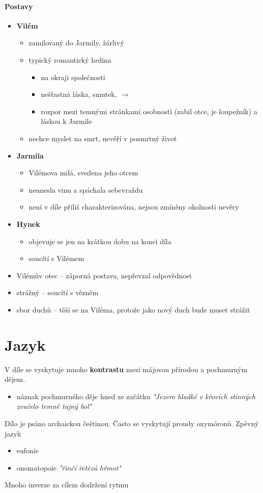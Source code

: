 \documentclass[10pt,a4paper]{article}
\newcommand{\ra}{$\rightarrow$ }
\begin{document}
\paragraph{Postavy}
\begin{itemize}
\item \textbf{Vilém}
	\begin{itemize}
	\item zamilovaný do Jarmily, žárlivý
	\item typický romantický hrdina
		\begin{itemize}
		\item na okraji společnosti
		\item nešťastná láska, smutek, \ra
		\item rozpor mezi temnými stránkami osobnosti (zabil otce, je loupežník) a láskou k Jarmile
		\end{itemize}
	\item nechce myslet na smrt, nevěří v posmrtný život
	\end{itemize}
\item \textbf{Jarmila}
	\begin{itemize}
	\item Vilémova milá, svedena jeho otcem
	\item neunesla vinu a spáchala sebevraždu
	\item není v díle příliš charakterizována, nejsou zmíněny okolnosti nevěry
	\end{itemize}
\item \textbf{Hynek}
	\begin{itemize}
	\item objevuje se jen na krátkou dobu na konci díla
	\item soucítí s Vilémem
	\end{itemize}
\item Vilémův otec -- záporná postava, nepřevzal odpovědnost
\item strážný -- soucítí s vězněm
\item sbor duchů -- těší se na Viléma, protože jako nový duch bude muset strážit
\end{itemize}
\section*{Jazyk}
V díle se vyskytuje mnoho \textbf{kontrastu} mezi májovou přírodou a pochmurným dějem.
\begin{itemize}
\item náznak pochmurného děje hned ze začátku \textit{"Jezero hladké v křovích stinných zvučelo temně tajný bol"}
\end{itemize}
Dílo je psáno archaickou češtinou. Často se vyskytují proudy oxymóronů. 
Zpěvný jazyk 
\begin{itemize}
\item eufonie
\item onomatopoie \textit{"řinčí řetězů hřmot"}
\end{itemize}
Mnoho inverze za cílem dodržení rytmu
\end{document}

